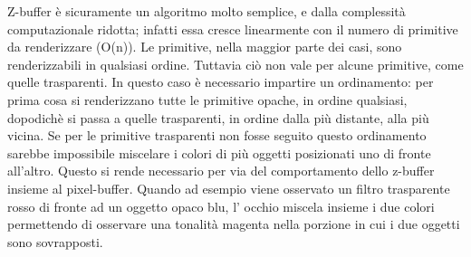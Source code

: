 Z-buffer è sicuramente un algoritmo molto semplice, e dalla complessità computazionale ridotta; infatti essa cresce linearmente con il numero di primitive da renderizzare (O(n)). Le primitive, nella maggior parte dei casi, sono renderizzabili in qualsiasi ordine. Tuttavia ciò non vale per alcune primitive, come quelle trasparenti. In questo caso è necessario impartire un ordinamento: per prima cosa si renderizzano tutte le primitive opache, in ordine qualsiasi, dopodichè si passa a quelle trasparenti, in ordine dalla più distante, alla più vicina. 
Se per le primitive trasparenti non fosse seguito questo ordinamento sarebbe impossibile miscelare i colori di più oggetti posizionati uno di fronte all’altro. Questo si rende necessario per via del comportamento dello z-buffer insieme al pixel-buffer.
Quando ad esempio viene osservato un filtro trasparente rosso di fronte ad un oggetto opaco blu, l’ occhio miscela insieme i due colori permettendo di osservare una tonalità magenta nella porzione in cui i due oggetti sono sovrapposti.
